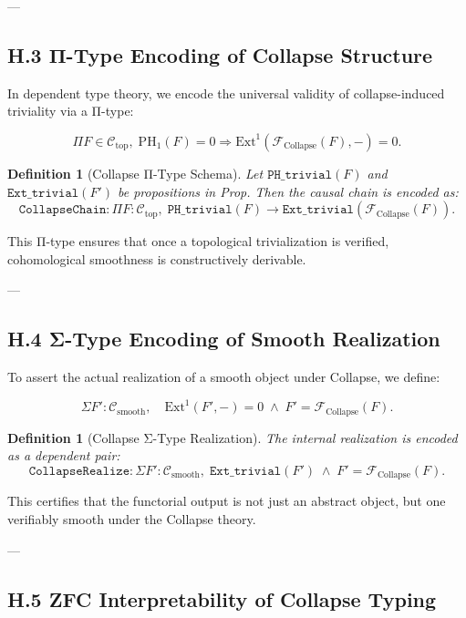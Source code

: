 \documentclass[11pt]{article}
\newtheorem{definition}[theorem]{Definition}
\begin{document}
---

\subsection*{H.3 Π-Type Encoding of Collapse Structure}

In dependent type theory, we encode the universal validity of collapse-induced triviality via a Π-type:

\[
\Pi F \in \mathcal{C}_{\text{top}}, \; \mathrm{PH}_1(F) = 0 \Rightarrow \mathrm{Ext}^1(\mathcal{F}_{\text{Collapse}}(F), -) = 0.
\]

\begin{definition}[Collapse Π-Type Schema]
\label{def:collapse-pi}
Let $\texttt{PH\_trivial}(F)$ and $\texttt{Ext\_trivial}(F')$ be propositions in Prop.  
Then the causal chain is encoded as:
\[
\texttt{CollapseChain} : \Pi F : \mathcal{C}_{\text{top}}, \; \texttt{PH\_trivial}(F) \to \texttt{Ext\_trivial}(\mathcal{F}_{\text{Collapse}}(F)).
\]
\end{definition}

This Π-type ensures that once a topological trivialization is verified, cohomological smoothness is constructively derivable.

---

\subsection*{H.4 Σ-Type Encoding of Smooth Realization}

To assert the actual realization of a smooth object under Collapse, we define:

\[
\Sigma F' : \mathcal{C}_{\text{smooth}}, \quad \mathrm{Ext}^1(F',-) = 0 \; \wedge \; F' = \mathcal{F}_{\text{Collapse}}(F).
\]

\begin{definition}[Collapse Σ-Type Realization]
\label{def:collapse-sigma}
The internal realization is encoded as a dependent pair:
\[
\texttt{CollapseRealize} : \Sigma F' : \mathcal{C}_{\text{smooth}}, \; \texttt{Ext\_trivial}(F') \; \wedge \; F' = \mathcal{F}_{\text{Collapse}}(F).
\]
\end{definition}

This certifies that the functorial output is not just an abstract object, but one verifiably smooth under the Collapse theory.

---

\subsection*{H.5 ZFC Interpretability of Collapse Typing}
\end{document}
